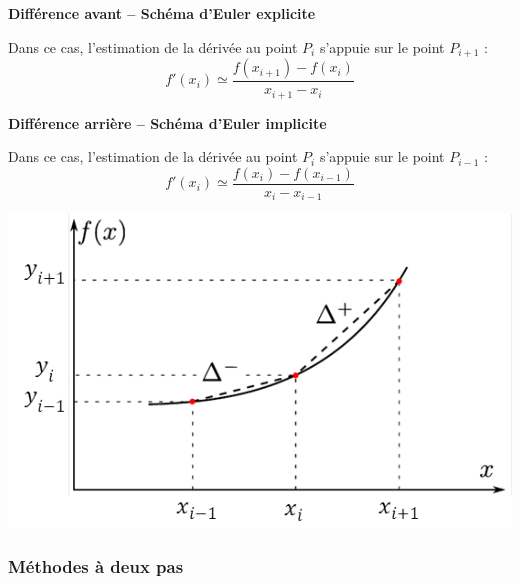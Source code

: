 \documentclass[10pt]{article}
\begin{document}
\begin{minipage}[c]{.49\linewidth}
\begin{resultat}
\textbf{Différence avant -- Schéma d'Euler explicite}

Dans ce cas, l'estimation de la dérivée au point $P_i$ s'appuie sur le point $P_{i+1}$ :
$$
f'(x_i)\simeq\dfrac{f(x_{i+1})-f(x_i)}{x_{i+1}-x_i}
$$
\end{resultat}

\begin{resultat}
\textbf{Différence arrière -- Schéma d'Euler implicite}

Dans ce cas, l'estimation de la dérivée au point $P_i$ s'appuie sur le point $P_{i-1}$ :
$$
f'(x_i)\simeq\dfrac{f(x_{i})-f(x_{i-1})}{x_{i}-x_{i-1}}
$$
\end{resultat}
\end{minipage}\hfill
\begin{minipage}[c]{.49\linewidth}
\begin{center}
\includegraphics[width=\textwidth]{images/derivation_1pas}
\end{center}
\end{minipage}

\subsubsection{Méthodes à deux pas}
\end{document}
